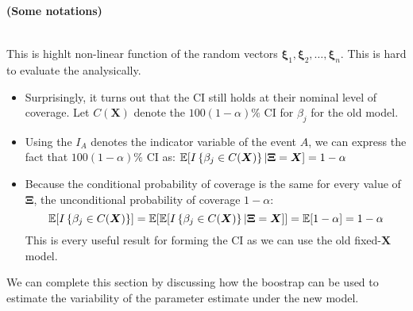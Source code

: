 \begin{remark}{\textbf{(Some notations)}}
\begin{itemize}
\begin{equation*}
\begin{aligned}
        \end{aligned}
        \end{equation*}
    \end{itemize} 
    This is highlt non-linear function of the random vectors $\boldsymbol \xi_1,\boldsymbol \xi_2,\dots,\boldsymbol \xi_n$. This is hard to evaluate the analysically. 
    \begin{itemize}
        \item Surprisingly, it turns out that the CI still holds at their nominal level of coverage. Let $C(\boldsymbol X)$ denote the $100(1-\alpha)\%$ CI for $\beta_j$ for the old model. 
        \item Using the $I_A$ denotes the indicator variable of the event $A$, we can express the fact that $100(1-\alpha)\%$ CI as: $\mathbb{E}[I\left\{ \beta_j \in C(\boldsymbol X) \right\} | \boldsymbol \Xi = \boldsymbol X] = 1-\alpha$
        \item Because the conditional probability of coverage is the same for every value of $\boldsymbol \Xi$, the unconditional probability of coverage $1-\alpha$:
        \begin{equation*}
            \mathbb{E}[I\left\{ \beta_j \in C(\boldsymbol X) \right\}] = \mathbb{E}[\mathbb{E}[I\left\{ \beta_j \in C(\boldsymbol X) \right\} | \boldsymbol \Xi = \boldsymbol X]] = \mathbb{E}[1-\alpha] = 1-\alpha
        \end{equation*}
        This is every useful result for forming the CI as we can use the old fixed-$\boldsymbol X$ model. 
    \end{itemize}
    We can complete this section by discussing how the boostrap can be used to estimate the variability of the parameter estimate under the new model. 
\end{remark}
